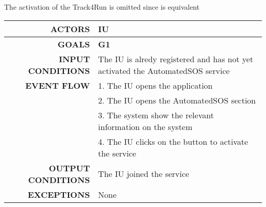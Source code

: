The activation of the Track4Run is omitted since is equivalent

\begin{table}[h!]
\begin{tabular}{|r|p{3in}|}
\hline
\textbf{ACTORS} & IU\\
\hline
\textbf{GOALS} & \textbf{G1} \\
\hline
\textbf{INPUT CONDITIONS} & The IU is alredy registered and has not yet activated the AutomatedSOS service \\
\hline
\textbf{EVENT FLOW} 
&1. The IU opens the application \\
&2. The IU opens the AutomatedSOS section\\
&3. The system show the relevant information on the system\\
&4. The IU clicks on the button to activate the service \\
\hline
\textbf{OUTPUT CONDITIONS} & The IU joined the service  \\
\hline
\textbf{EXCEPTIONS} 
& None \\
\hline
\end{tabular}
\end{table}
